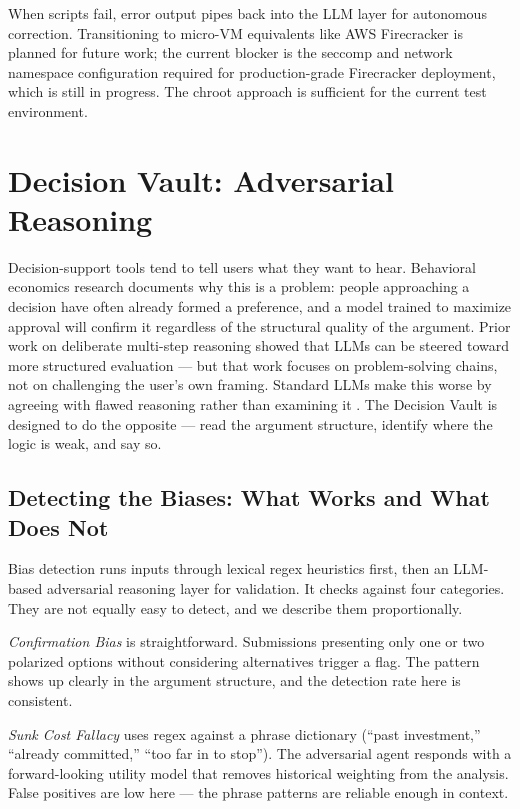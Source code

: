 \documentclass[conference]{IEEEtran}
\begin{document}
When scripts fail, error output pipes back into the LLM layer for autonomous correction. Transitioning to micro-VM equivalents like AWS Firecracker is planned for future work; the current blocker is the seccomp and network namespace configuration required for production-grade Firecracker deployment, which is still in progress. The chroot approach is sufficient for the current test environment.

\section{Decision Vault: Adversarial Reasoning}

Decision-support tools tend to tell users what they want to hear. Behavioral economics research documents why this is a problem: people approaching a decision have often already formed a preference, and a model trained to maximize approval will confirm it regardless of the structural quality of the argument. Prior work on deliberate multi-step reasoning \cite{yao2023tree} showed that LLMs can be steered toward more structured evaluation --- but that work focuses on problem-solving chains, not on challenging the user's own framing. Standard LLMs make this worse by agreeing with flawed reasoning rather than examining it \cite{zheng2023judging}. The Decision Vault is designed to do the opposite --- read the argument structure, identify where the logic is weak, and say so.

\subsection{Detecting the Biases: What Works and What Does Not}

Bias detection runs inputs through lexical regex heuristics first, then an LLM-based adversarial reasoning layer for validation. It checks against four categories. They are not equally easy to detect, and we describe them proportionally.

\textit{Confirmation Bias} is straightforward. Submissions presenting only one or two polarized options without considering alternatives trigger a flag. The pattern shows up clearly in the argument structure, and the detection rate here is consistent.

\textit{Sunk Cost Fallacy} uses regex against a phrase dictionary (``past investment,'' ``already committed,'' ``too far in to stop''). The adversarial agent responds with a forward-looking utility model that removes historical weighting from the analysis. False positives are low here --- the phrase patterns are reliable enough in context.
\end{document}
